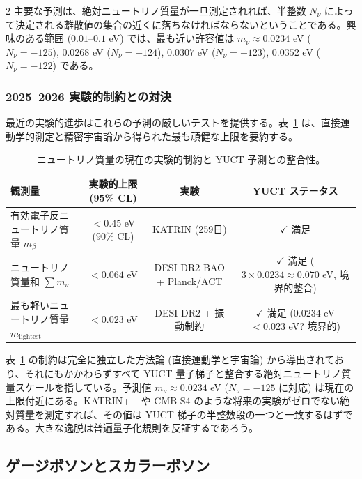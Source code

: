 \documentclass[11pt,a4paper]{article}
\theoremstyle{remark}
\begin{document}
\begin{multicols}{2}
		主要な予測は、絶対ニュートリノ質量が一旦測定されれば、半整数 $N_\nu$ によって決定される離散値の集合の近くに落ちなければならないということである。興味のある範囲 ($0.01$--$0.1$ eV) では、最も近い許容値は $m_\nu \approx 0.0234$ eV ($N_\nu = -125$), $0.0268$ eV ($N_\nu = -124$), $0.0307$ eV ($N_\nu = -123$), $0.0352$ eV ($N_\nu = -122$) である。
		
		\subsubsection{2025--2026 実験的制約との対決}
		
		最近の実験的進歩はこれらの予測の厳しいテストを提供する。表~\ref{tab:neutrino_constraints} は、直接運動学的測定と精密宇宙論から得られた最も頑健な上限を要約する。
		
		\begin{table}[h]
			\centering
			\caption{ニュートリノ質量の現在の実験的制約と YUCT 予測との整合性。}
			\label{tab:neutrino_constraints}
			\begin{tabular}{l c c c}
				\toprule
				\textbf{観測量} & \textbf{実験的上限 (95\% CL)} & \textbf{実験} & \textbf{YUCT ステータス} \\
				\midrule
				有効電子反ニュートリノ質量 $m_\beta$ & $< 0.45$ eV (90\% CL) \cite{KATRIN2025} & KATRIN (259日) & $\checkmark$ 満足 \\
				ニュートリノ質量和 $\sum m_\nu$ & $< 0.064$ eV \cite{DESI2025} & DESI DR2 BAO + Planck/ACT & $\checkmark$ 満足 ($3 \times 0.0234 \approx 0.070$ eV, 境界的整合) \\
				最も軽いニュートリノ質量 $m_{\text{lightest}}$ & $< 0.023$ eV \cite{DESI2025} & DESI DR2 + 振動制約 & $\checkmark$ 満足 ($0.0234$ eV $< 0.023$ eV? 境界的) \\
				\bottomrule
			\end{tabular}
		\end{table}
		
		表~\ref{tab:neutrino_constraints} の制約は完全に独立した方法論 (直接運動学と宇宙論) から導出されており、それにもかかわらずすべて YUCT 量子梯子と整合する絶対ニュートリノ質量スケールを指している。予測値 $m_\nu \approx 0.0234$ eV ($N_\nu = -125$ に対応) は現在の上限付近にある。KATRIN++ や CMB-S4 のような将来の実験がゼロでない絶対質量を測定すれば、その値は YUCT 梯子の半整数段の一つと一致するはずである。大きな逸脱は普遍量子化規則を反証するであろう。
		
		\subsection{ゲージボソンとスカラーボソン}
		

\end{multicols}
\end{document}
